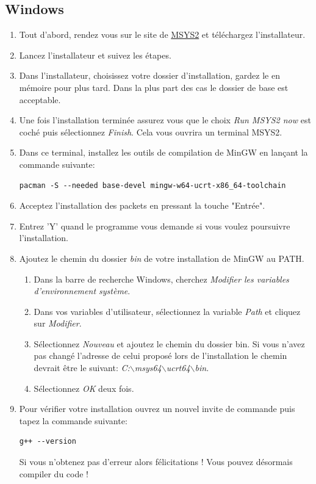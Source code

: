 \subsection{Windows}
\begin{enumerate}
	\item Tout d'abord, rendez vous sur le site de \href{https://www.msys2.org/docs/installer/}{MSYS2} et téléchargez l'installateur.
	\item Lancez l'installateur et suivez les étapes.
	\item Dans l'installateur, choisissez votre dossier d'installation, gardez le en mémoire pour plus tard. Dans la plus part des cas le dossier de base est acceptable.
	\item Une fois l'installation terminée assurez vous que le choix \emph{Run MSYS2 now} est coché puis sélectionnez \emph{Finish}. Cela vous ouvrira un terminal MSYS2.
	\item Dans ce terminal, installez les outils de compilation de MinGW en lançant la commande suivante:
		\begin{lstlisting}[xleftmargin=-12em]
			pacman -S --needed base-devel mingw-w64-ucrt-x86_64-toolchain
		\end{lstlisting}
	\item Acceptez l'installation des packets en pressant la touche "Entrée".
	\item Entrez 'Y' quand le programme vous demande si vous voulez poursuivre l'installation.
	\item Ajoutez le chemin du dossier \emph{bin} de votre installation de MinGW au PATH.
		\begin{enumerate}
			\item Dans la barre de recherche Windows, cherchez \emph{Modifier les variables d'environnement système}.
			\item Dans vos variables d'utilisateur, sélectionnez la variable \emph{Path} et cliquez sur \emph{Modifier}.
			\item Sélectionnez \emph{Nouveau} et ajoutez le chemin du dossier bin. Si vous n'avez pas changé l'adresse de celui proposé lors de l'installation le chemin devrait être le suivant: \emph{C:$\backslash$msys64$\backslash$ucrt64$\backslash$bin}.
			\item Sélectionnez \emph{OK} deux fois.
		\end{enumerate}
	\item Pour vérifier votre installation ouvrez un nouvel invite de commande puis tapez la commande suivante:
		\begin{lstlisting}[xleftmargin=-12em]
			g++ --version
		\end{lstlisting}
		Si vous n'obtenez pas d'erreur alors félicitations ! Vous pouvez désormais compiler du code \cpp !
\end{enumerate}


